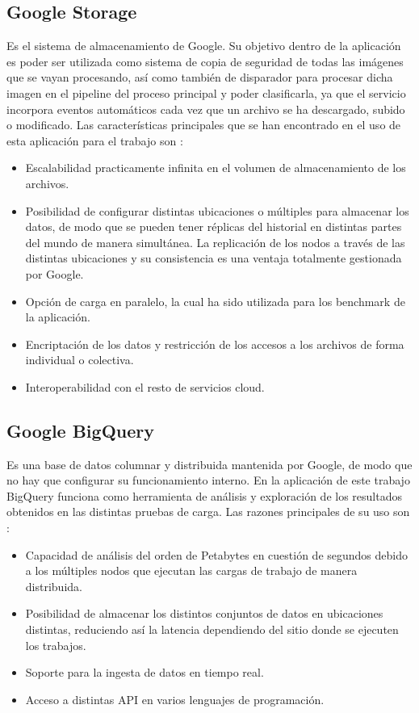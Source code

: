\subsection{Google Storage}\label{subsec:storage}
Es el sistema de almacenamiento de Google.
Su objetivo dentro de la aplicación es poder ser utilizada como sistema de copia de seguridad de todas las imágenes que se vayan procesando, así como también de disparador para procesar dicha
imagen en el pipeline del proceso principal y poder clasificarla, ya que el servicio incorpora eventos automáticos cada vez que un archivo se ha descargado, subido o modificado.
Las características principales que se han encontrado en el uso de esta aplicación para el trabajo son :
\begin{itemize}
    \item Escalabilidad practicamente infinita en el volumen de almacenamiento de los archivos.
    \item Posibilidad de configurar distintas ubicaciones o múltiples para almacenar los datos, de modo que se pueden tener réplicas del historial en distintas partes del mundo de manera simultánea.
    La replicación de los nodos a través de las distintas ubicaciones y su consistencia es una ventaja totalmente gestionada por Google.
    \item Opción de carga en paralelo, la cual ha sido utilizada para los benchmark de la aplicación.
    \item Encriptación de los datos y restricción de los accesos a los archivos de forma individual o colectiva.
    \item Interoperabilidad con el resto de servicios cloud.
\end{itemize}

\subsection{Google BigQuery}\label{subsec:bigquery}
Es una base de datos columnar y distribuida mantenida por Google, de modo que no hay que configurar su funcionamiento interno.
En la aplicación de este trabajo BigQuery funciona como herramienta de análisis y exploración de los resultados obtenidos en las distintas pruebas de carga.
Las razones principales de su uso son :
\begin{itemize}
    \item Capacidad de análisis del orden de Petabytes en cuestión de segundos debido a los múltiples nodos que ejecutan las cargas de trabajo de manera distribuida.
    \item Posibilidad de almacenar los distintos conjuntos de datos en ubicaciones distintas, reduciendo así la latencia dependiendo del sitio donde se ejecuten los trabajos.
    \item Soporte para la ingesta de datos en tiempo real.
    \item Acceso a distintas API en varios lenguajes de programación.
\end{itemize}

